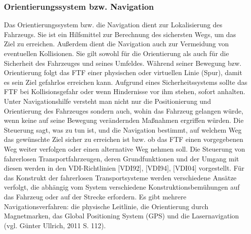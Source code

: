 \subsubsection{Orientierungssystem bzw. Navigation}
Das Orientierungssystem bzw. die Navigation dient zur Lokalisierung des Fahrzeugs. Sie ist ein Hilfsmittel zur Berechnung des sichersten Wegs, um das Ziel zu erreichen. Au\ss erdem dient die Navigation auch zur Vermeidung von eventuellen Kollisionen. Sie gilt sowohl f\"ur die Orientierung als auch f\"ur die Sicherheit des Fahrzeuges und seines Umfeldes. W\"ahrend seiner Bewegung bzw. Orientierung folgt das FTF einer physischen oder virtuellen Linie (Spur), damit es sein Ziel gefahrlos erreichen kann. Aufgrund eines Sicherheitssystems sollte das FTF bei Kollisionsgefahr oder wenn Hindernisse vor ihm stehen, sofort anhalten. 
Unter Navigationshilfe versteht man nicht nur die Positionierung und Orientierung des Fahrzeuges sondern auch, wohin das Fahrzeug gelangen w\"urde, wenn keine auf seine Bewegung ver\"andernden Ma\ss nahmen ergriffen würden.
Die Steuerung sagt, was zu tun ist, und die Navigation bestimmt, auf welchem Weg das gew\"unschte Ziel sicher zu erreichen ist bzw. ob das FTF einen vorgegebenen Weg weiter verfolgen oder einen alternative Weg nehmen soll.
Die Steuerung von fahrerlosen Transportfahrzeugen, deren Grundfunktionen und der Umgang mit diesen werden in den VDI-Richtlinien [VDI92], [VDI94], [VDI04] vorgestellt.
F\"ur das Konstrukt der fahrerlosen Transportsysteme werden verschiedene Ans\"atze verfolgt, die abh\"angig vom System verschiedene Konstruktionsbem\"uhungen auf das Fahrzeug oder auf der Strecke erfordern.
Es gibt mehrere Navigationsverfahren: die physische Leitlinie, die Orientierung durch Magnetmarken, das Global Positioning System (GPS) und die Lasernavigation (vgl. G\"unter Ullrich, 2011 S. 112).
